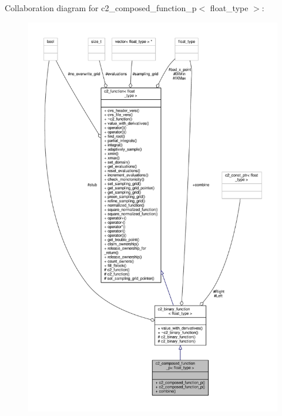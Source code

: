 Collaboration diagram for c2\+\_\+composed\+\_\+function\+\_\+p$<$ float\+\_\+type $>$\+:
\nopagebreak
\begin{figure}[H]
\begin{center}
\leavevmode
\includegraphics[width=350pt]{classc2__composed__function__p__coll__graph}
\end{center}
\end{figure}
